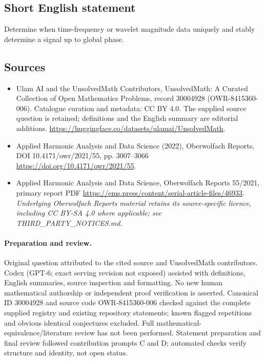 \documentclass[11pt]{article}
\begin{document}
\subsection{Short English statement}
Determine when time-frequency or wavelet magnitude data uniquely and stably determine a signal up to global phase.
\subsection{Sources}
\begin{itemize}
\item[\hypertarget{source:30004928:1}{S1}] Ulam AI and the UnsolvedMath Contributors, UnsolvedMath: A Curated Collection of Open Mathematics Problems, record 30004928 (OWR-8415360-006). Catalogue curation and metadata: CC BY 4.0. The supplied source question is retained; definitions and the English summary are editorial additions.
\url{https://huggingface.co/datasets/ulamai/UnsolvedMath}.
\item[\hypertarget{source:30004928:2}{S2}] Applied Harmonic Analysis and Data Science (2022), Oberwolfach Reports, DOI 10.4171/owr/2021/55, pp. 3007--3066
\url{https://doi.org/10.4171/owr/2021/55}.
\item[\hypertarget{source:30004928:3}{S3}] Applied Harmonic Analysis and Data Science, Oberwolfach Reports 55/2021, primary report PDF
\url{https://ems.press/content/serial-article-files/46933}.
\textit{Underlying Oberwolfach Reports material retains its source-specific licence, including CC BY-SA 4.0 where applicable; see THIRD\_PARTY\_NOTICES.md.}
\end{itemize}
\paragraph{Preparation and review.}
Original question attributed to the cited source and UnsolvedMath contributors. Codex (GPT-6; exact serving revision not exposed) assisted with definitions, English summaries, source inspection and formatting. No new human mathematical authorship or independent proof verification is asserted. Canonical ID 30004928 and source code OWR-8415360-006 checked against the complete supplied registry and existing repository statements; known flagged repetitions and obvious identical conjectures excluded. Full mathematical-equivalence/literature review has not been performed. Statement preparation and final review followed contribution prompts C and D; automated checks verify structure and identity, not open status.
\label{end:30004928}
\end{document}
